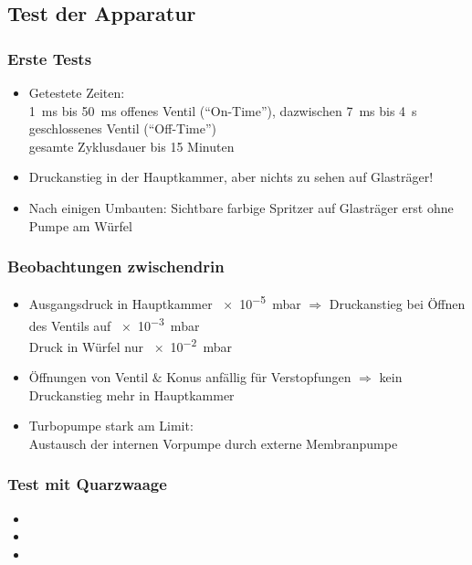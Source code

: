 \documentclass{beamer}
\begin{document}


\subsection[Ergebnisse]{Test der Apparatur}

\begin{frame}
\frametitle{Erste Tests}
\begin{itemize}\setlength{\itemsep}{+15pt}
  \item Getestete Zeiten: \\
  \SI{1}{ms} bis \SI{50}{ms} offenes Ventil ("`On-Time"'), dazwischen \SI{7}{ms} bis \SI{4}{s} geschlossenes
  Ventil ("`Off-Time"')\\ 
  gesamte Zyklusdauer bis 15 Minuten
  \item Druckanstieg in der Hauptkammer, aber nichts zu sehen auf Glasträger!
  \item Nach einigen Umbauten: Sichtbare farbige Spritzer auf Glasträger erst ohne Pumpe am Würfel
\end{itemize}
\end{frame}


\begin{frame}
\frametitle{Beobachtungen zwischendrin}
\begin{itemize}\setlength{\itemsep}{+15pt}
  \item Ausgangsdruck in Hauptkammer \SI{e-5}{mbar} $\Rightarrow$ Druckanstieg bei Öffnen des
  Ventils auf \SI{e-3}{mbar}\\
  Druck in Würfel nur \SI{e-2}{mbar}
  \item Öffnungen von Ventil $\&$ Konus anfällig für Verstopfungen $\Rightarrow$ kein Druckanstieg
  mehr in Hauptkammer
  \item Turbopumpe stark am Limit:\\
  Austausch der internen Vorpumpe durch externe Membranpumpe
\end{itemize}
\end{frame}

\begin{frame}
\frametitle{Test mit Quarzwaage}
\begin{itemize}\setlength{\itemsep}{+15pt}
  \item 
  \item 
  \item 
\end{itemize}
\end{frame}
\end{document}
